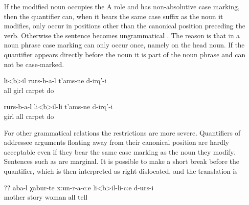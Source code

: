 If the modified noun occupies the A role and has non-absolutive case marking, then the quantifier can, when it bears the same case suffix as the noun it modifies, only occur in positions other than the canonical position preceding the verb. Otherwise the sentence becomes ungrammatical . The reason is that in a noun phrase case marking can only occur once, namely on the head noun. If the quantifier appears directly before the noun it is part of the noun phrase and can not be case-marked.

%
\begin{exe}
	\ex	\label{ex:All girls used to make carpets@14}
	\begin{xlist}
		\ex	\label{ex:All girls used to make carpets@14a}
		\gll	li<b>il	rurs-b-a-l	t'ams-ne	d-irq'-i\\
			all	girl	carpet	do\\
		\glt	{}
	
		\ex	\label{ex:All girls used to make carpets@14b}
		\gll	rurs-b-a-l	li<b>il-li	t'ams-ne	d-irq'-i\\
			girl	all	carpet	do\\
		\glt	{}
		
\ex 	{}	\label{ex:All girls used to make carpets@14c}
		
	\end{xlist}
\end{exe}

For other grammatical relations the restrictions are more severe. Quantifiers of addressee arguments floating away from their canonical position are hardly acceptable even if they bear the same case marking as the noun they modify. Sentences such as  are marginal. It is possible to make a short break before the quantifier, which is then interpreted as right dislocated, and the translation is 
%
\begin{exe}
	\ex	\label{ex:Mother told the stories to all women@15}
	\gll	?? 	aba-l	χabur-te	xːun-r-a-cːe	li<b>il-li-cːe	d-urs-i\\	
		{}	mother	story	woman	all	tell\\
	\glt	{}
\end{exe}

